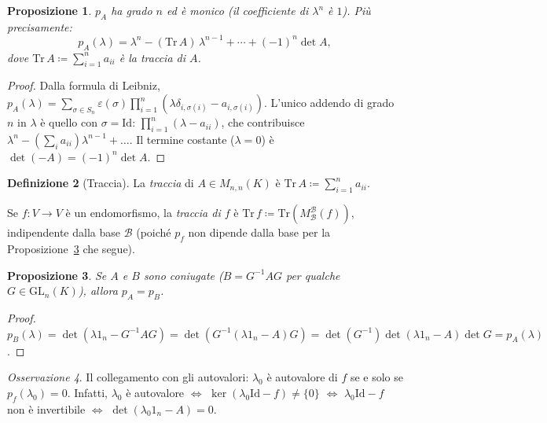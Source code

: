 \documentclass[11pt, a4paper]{book}
\theoremstyle{definition}
\newtheorem{definizione}{Definizione}[section]
\theoremstyle{plain}
\newtheorem{proposizione}[definizione]{Proposizione}
\theoremstyle{remark}
\newtheorem{osservazione}[definizione]{Osservazione}
\newcommand{\Id}{\mathrm{Id}}
\newcommand{\GL}{\mathrm{GL}}
\begin{document}
\begin{proposizione}
\label{prop:polcar-monico}
$p_A$ ha grado $n$ ed è monico (il coefficiente di $\lambda^n$ è $1$). Più precisamente:
\[
  p_A(\lambda) = \lambda^n - (\mathrm{Tr}\, A)\,\lambda^{n-1} + \cdots + (-1)^n \det A,
\]
dove $\mathrm{Tr}\, A \coloneqq \sum_{i=1}^n a_{ii}$ è la \emph{traccia} di $A$.
\end{proposizione}

\begin{proof}
Dalla formula di Leibniz, $p_A(\lambda) = \sum_{\sigma \in S_n}\varepsilon(\sigma)\prod_{i=1}^n(\lambda\delta_{i,\sigma(i)} - a_{i,\sigma(i)})$. L'unico addendo di grado $n$ in $\lambda$ è quello con $\sigma = \mathrm{Id}$: $\prod_{i=1}^n(\lambda - a_{ii})$, che contribuisce $\lambda^n - (\sum_i a_{ii})\lambda^{n-1} + \ldots$. Il termine costante ($\lambda=0$) è $\det(-A) = (-1)^n\det A$.
\end{proof}

\begin{defbox}
\begin{definizione}[Traccia]
La \emph{traccia} di $A \in M_{n,n}(K)$ è $\mathrm{Tr}\,A \coloneqq \sum_{i=1}^n a_{ii}$.

Se $f \colon V \to V$ è un endomorfismo, la \emph{traccia di $f$} è $\mathrm{Tr}\,f \coloneqq \mathrm{Tr}(M^{\mathcal{B}}_{\mathcal{B}}(f))$, indipendente dalla base $\mathcal{B}$ (poiché $p_f$ non dipende dalla base per la Proposizione~\ref{prop:polcar-coniugazione} che segue).
\end{definizione}
\end{defbox}

\begin{proposizione}
\label{prop:polcar-coniugazione}
Se $A$ e $B$ sono coniugate ($B = G^{-1}AG$ per qualche $G \in \GL_n(K)$), allora $p_A = p_B$.
\end{proposizione}

\begin{proof}
$p_B(\lambda) = \det(\lambda 1_n - G^{-1}AG) = \det(G^{-1}(\lambda 1_n - A)G) = \det(G^{-1})\det(\lambda 1_n - A)\det G = p_A(\lambda)$.
\end{proof}

\begin{osservazione}
Il collegamento con gli autovalori: $\lambda_0$ è autovalore di $f$ se e solo se $p_f(\lambda_0) = 0$. Infatti, $\lambda_0$ è autovalore $\Leftrightarrow$ $\ker(\lambda_0 \Id - f) \neq \{0\}$ $\Leftrightarrow$ $\lambda_0 \Id - f$ non è invertibile $\Leftrightarrow$ $\det(\lambda_0 1_n - A) = 0$.
\end{osservazione}
\end{document}
